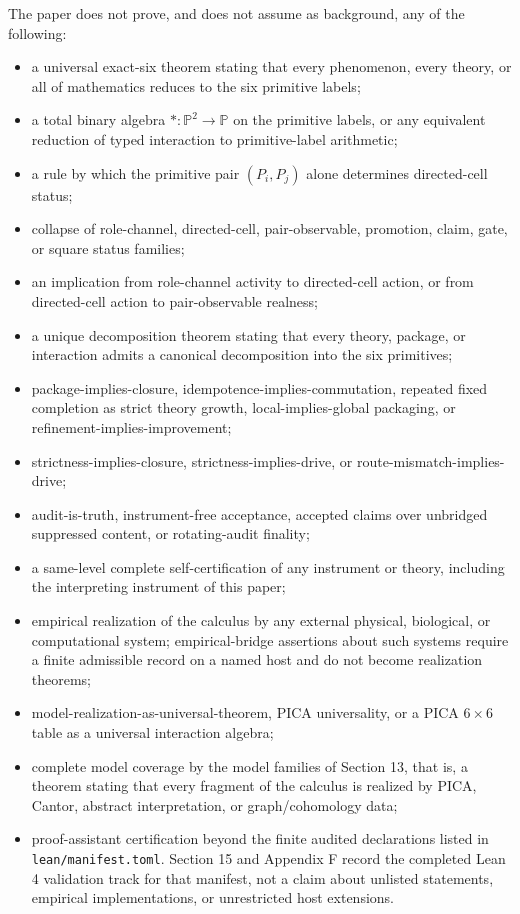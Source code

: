\documentclass[11pt]{article}
\providecommand{\tightlist}{}
\theoremstyle{definition}
\begin{document}
The paper does not prove, and does not assume as background, any of the following:

\begin{itemize}
\tightlist
\item
  a universal exact-six theorem stating that every phenomenon, every theory, or all of mathematics reduces to the six primitive labels;
\item
  a total binary algebra \(*:\mathbb P^2\to\mathbb P\) on the primitive labels, or any equivalent reduction of typed interaction to primitive-label arithmetic;
\item
  a rule by which the primitive pair \((P_i,P_j)\) alone determines directed-cell status;
\item
  collapse of role-channel, directed-cell, pair-observable, promotion, claim, gate, or square status families;
\item
  an implication from role-channel activity to directed-cell action, or from directed-cell action to pair-observable realness;
\item
  a unique decomposition theorem stating that every theory, package, or interaction admits a canonical decomposition into the six primitives;
\item
  package-implies-closure, idempotence-implies-commutation, repeated fixed completion as strict theory growth, local-implies-global packaging, or refinement-implies-improvement;
\item
  strictness-implies-closure, strictness-implies-drive, or route-mismatch-implies-drive;
\item
  audit-is-truth, instrument-free acceptance, accepted claims over unbridged suppressed content, or rotating-audit finality;
\item
  a same-level complete self-certification of any instrument or theory, including the interpreting instrument of this paper;
\item
  empirical realization of the calculus by any external physical, biological, or computational system; empirical-bridge assertions about such systems require a finite admissible record on a named host and do not become realization theorems;
\item
  model-realization-as-universal-theorem, PICA universality, or a PICA \(6\times6\) table as a universal interaction algebra;
\item
  complete model coverage by the model families of Section 13, that is, a theorem stating that every fragment of the calculus is realized by PICA, Cantor, abstract interpretation, or graph/cohomology data;
\item
  proof-assistant certification beyond the finite audited declarations listed in \texttt{lean/manifest.toml}. Section 15 and Appendix F record the completed Lean 4 validation track for that manifest, not a claim about unlisted statements, empirical implementations, or unrestricted host extensions.
\end{itemize}
\end{document}
